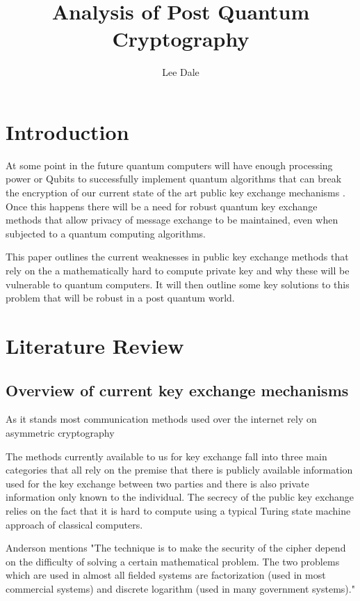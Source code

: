 \documentclass{article}
\title{Analysis of Post Quantum Cryptography}
\author{Lee Dale}
\begin{document}
\maketitle

\section{Introduction}

At some point in the future quantum computers will have enough processing power or Qubits to successfully implement quantum algorithms that can break the encryption of our current state of the art public key exchange mechanisms \cite{Bellizia2021Post-QuantumDesign}. Once this happens there will be a need for robust quantum key exchange methods that allow privacy of message exchange to be maintained, even when subjected to a quantum computing algorithms. 

This paper outlines the current weaknesses in public key exchange methods that rely on the a mathematically hard to compute private key and why these will be vulnerable to quantum computers. It will then outline some key solutions to this problem that will be robust in a post quantum world. 

\section{Literature Review}

\subsection{Overview of current key exchange mechanisms}
As it stands most communication methods used over the internet rely on asymmetric cryptography

The methods currently available to us for key exchange fall into three main categories that all rely on the premise that there is publicly available information used for the key exchange between two parties and there is also private information only known to the individual. The secrecy of the public key exchange relies on the fact  that it is hard to compute using a typical Turing state machine approach of classical computers. 

Anderson mentions \cite{AndersonR2020} "The technique is to make the security of the cipher depend on the difficulty of solving a certain mathematical problem. The two problems which are used in almost all fielded systems are factorization (used in most commercial systems) and discrete logarithm (used in many government systems)." 
\end{document}
